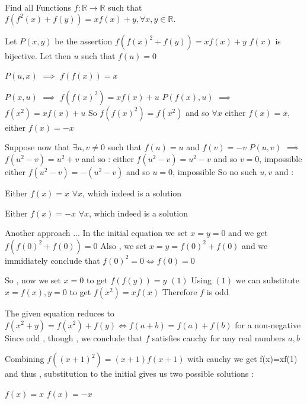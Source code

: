 \begin{solution}
	\begin{tcolorbox}Find all Functions $f:\mathbb R \to \mathbb R$ such that $f\left( {{f^2}\left( x \right) + f\left( y \right)} \right) = xf\left( x \right) + y,\forall x,y \in \mathbb R.$\end{tcolorbox}
Let $P(x,y)$ be the assertion $f(f(x)^2+f(y))=xf(x)+y$
$f(x)$ is bijective.
Let then $u$ such that $f(u)=0$

$P(u,x)$ $\implies$ $f(f(x))=x$

$P(x,u)$ $\implies$ $f(f(x)^2)=xf(x)+u$
$P(f(x),u)$ $\implies$ $f(x^2)=xf(x)+u$
So $f(f(x)^2)=f(x^2)$ and so $\forall x$ either $f(x)=x$, either $f(x)=-x$

Suppose now that $\exists u,v\ne 0$ such that $f(u)=u$ and $f(v)=-v$
$P(u,v)$ $\implies$ $f(u^2-v)=u^2+v$ and so :
either $f(u^2-v)=u^2-v$ and so $v=0$, impossible
either $f(u^2-v)=-(u^2-v)$ and so $u=0$, impossible
So no such $u,v$ and :

Either $\boxed{f(x)=x}$ $\forall x$, which indeed is a solution

Either $\boxed{f(x)=-x}$ $\forall x$, which indeed is a solution
\end{solution}



\begin{solution}
	Another approach ...
In the initial equation we set $x=y=0$ and we get $f(f(0)^{2}+f(0))=0$ 
Also , we set $x=y=f(0)^{2}+f(0)$ and we immidiately conclude that $f(0)^2=0\Leftrightarrow f(0)=0$

So , now we set $x=0$ to get $f(f(y))=y$        $(1)$
Using $(1)$ we can substitute $x=f(x), y=0$ to get $f(x^2)=xf(x)$
Therefore $f$ is odd 

The given equation reduces to 
$f(x^{2}+y)=f(x^{2})+f(y)\Leftrightarrow f(a+b)=f(a)+f(b) $ for a non-negative 
Since odd , though , we conclude that $f$ satisfies cauchy for any real numbers $a,b$

Combining $f((x+1)^2)=(x+1)f(x+1)$ with cauchy we get f(x)=xf(1)
and thus , substitution to the initial gives us two possible solutions :

$f(x)=x$
$f(x)=-x$
\end{solution}




